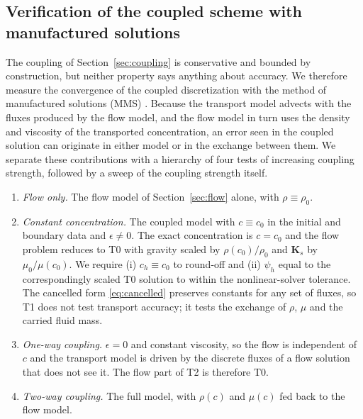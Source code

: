 \subsection{Verification of the coupled scheme with manufactured solutions}
\label{sec:mms}

The coupling of Section~\ref{sec:coupling} is conservative and bounded by
construction, but neither property says anything about accuracy. We therefore
measure the convergence of the coupled discretization with the method of
manufactured solutions (MMS) \cite{roache2002,salari2000}. Because the
transport model advects with the fluxes produced by the flow model, and the
flow model in turn uses the density and viscosity of the transported
concentration, an error seen in the coupled solution can originate in either
model or in the exchange between them. We separate these contributions with a
hierarchy of four tests of increasing coupling strength, followed by a sweep
of the coupling strength itself.

\begin{enumerate}
  \item[\textbf{T0}] \emph{Flow only.} The flow model of
    Section~\ref{sec:flow} alone, with $\rho\equiv\rho_0$.
  \item[\textbf{T1}] \emph{Constant concentration.} The coupled model with
    $c\equiv c_0$ in the initial and boundary data and $\epsilon\neq0$. The
    exact concentration is $c=c_0$ and the flow problem reduces to T0 with
    gravity scaled by $\rho(c_0)/\rho_0$ and $\mathbf{K}_s$ by
    $\mu_0/\mu(c_0)$. We require (i) $c_h\equiv c_0$ to round-off and (ii)
    $\psi_h$ equal to the correspondingly scaled T0 solution to within the
    nonlinear-solver tolerance. The cancelled form \eqref{eq:cancelled}
    preserves constants for any set of fluxes, so T1 does not test transport
    accuracy; it tests the exchange of $\rho$, $\mu$ and the carried fluid
    mass.
  \item[\textbf{T2}] \emph{One-way coupling.} $\epsilon=0$ and constant
    viscosity, so the flow is independent of $c$ and the transport model is
    driven by the discrete fluxes of a flow solution that does not see it.
    The flow part of T2 is therefore T0.
  \item[\textbf{T3}] \emph{Two-way coupling.} The full model, with $\rho(c)$
    and $\mu(c)$ fed back to the flow model.
\end{enumerate}

